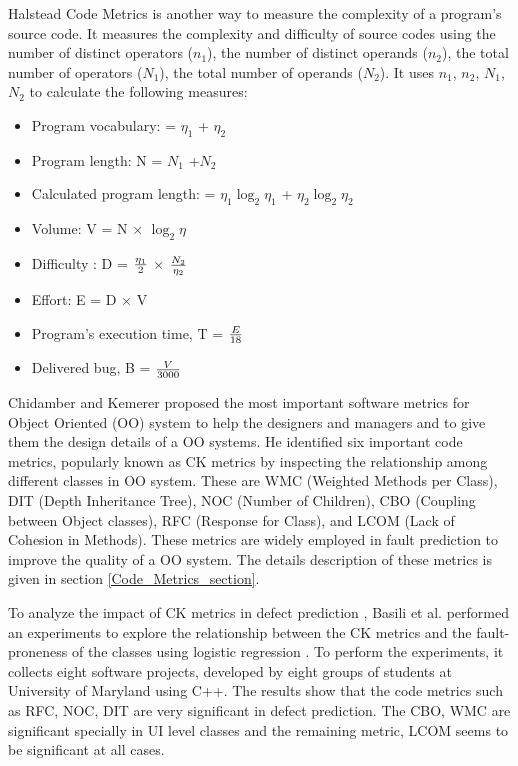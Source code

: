 \documentclass[12pt]{report}
\begin{document}
Halstead Code Metrics \cite{halstead1977elements} is another way to measure the complexity of a program's source code. It measures the complexity and difficulty of source codes using the number of distinct operators ($n_{1}$), the number of distinct operands ($n_{2}$), the total number of operators ($N_{1}$), the total number of operands ($N_{2}$). It uses $n_{1}$, $n_{2}$, $N_{1}$, $N_{2}$ to calculate the following measures: 

\begin{itemize}
	\item Program vocabulary: \eta = $\eta_1$ + $\eta_2$ \,
	\item Program length: N = $N_1$ +$N_2$ \,
	\item Calculated program length:  = $\eta_1 \log_2 \eta_1$ + $\eta_2 \log_2 \eta_2$ \, 
	\item Volume: V = N $\times$ $\log_2 \eta$ \,
	\item Difficulty : D = { $\eta_1 \over 2 $ } $\times$ { $N_2 \over \eta_2$ } \,
	\item Effort: E =  D $\times$ V \,
	\item Program’s execution time, T = {$E \over 18$}\,
	\item Delivered bug, B = {$V \over 3000$} \,
\end{itemize}


Chidamber and Kemerer \cite{chidamber1994metrics} proposed the most important software metrics for Object Oriented (OO) system to help the designers and managers and to give them the design details of a OO systems. He identified six  important code metrics, popularly known as CK metrics by inspecting the relationship among different classes in OO system. These are WMC (Weighted Methods per Class), DIT (Depth Inheritance Tree), NOC (Number of Children), CBO (Coupling between Object classes), RFC (Response for Class), and LCOM (Lack of Cohesion in Methods). These metrics are widely employed in fault prediction to improve the quality of a OO system. The details description of these metrics is given in section \ref{Code_Metrics_section}. 

To analyze the impact of CK metrics in defect prediction \cite{chidamber1994metrics}, Basili et al. performed an experiments to explore the relationship between the CK metrics and the fault-proneness of the classes using logistic regression \cite{basili1996validation}. To perform the experiments, it collects eight software projects, developed by eight groups of students at University of Maryland using C++. The results show that the code metrics such as RFC, NOC, DIT are very significant in defect prediction. The CBO, WMC are significant specially in UI level classes and the remaining metric, LCOM seems to be significant at all cases.  
\end{document}
